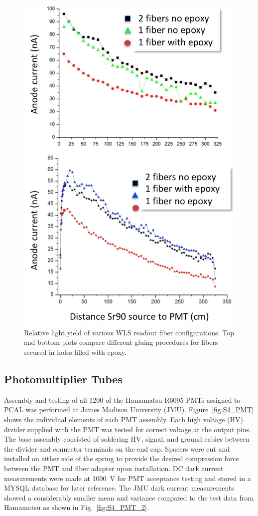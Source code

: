 \begin{figure}[hbt]
\centering
\includegraphics[width=0.85\columnwidth,keepaspectratio]{img/S4_4.png}
\caption{Relative light yield of various WLS readout fiber configurations. Top and bottom plots compare different
  gluing procedures for fibers secured in holes filled with epoxy.}
\label{fig:S4_4}
\end{figure}

\subsection{Photomultiplier Tubes}

Assembly and testing of all 1200 of the Hamamatsu R6095 PMTs assigned to PCAL was performed at James
Madison University (JMU). Figure~\ref{fig:S4_PMT} shows the individual elements of each PMT assembly. Each
high voltage (HV) divider supplied with the PMT was tested for correct voltage at the output pins. The base
assembly consisted of soldering HV, signal, and ground cables between the divider and connector terminals on the
end cap. Spacers were cut and installed on either side of the spring to provide the desired compression force
between the PMT and fiber adapter upon installation. DC dark current measurements were made at 1000~V for
PMT acceptance testing and stored in a MYSQL database for later reference. The JMU dark current
measurements showed a considerably smaller mean and variance compared to the test data from Hamamatsu as
shown in Fig.~\ref{fig:S4_PMT_2}. 

